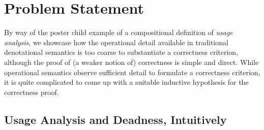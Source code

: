 \section{Problem Statement}
\label{sec:problem}

By way of the poster child example of a compositional definition of \emph{usage
analysis}, we showcase how the operational detail available in traditional
denotational semantics is too coarse to substantiate a correctness criterion,
although the proof of (a weaker notion of) correctness is simple and direct.
While operational semantics observe sufficient detail to formulate a correctness
criterion, it is quite complicated to come up with a suitable inductive
hypothesis for the correctness proof.

%
%

\subsection{Usage Analysis and Deadness, Intuitively}

